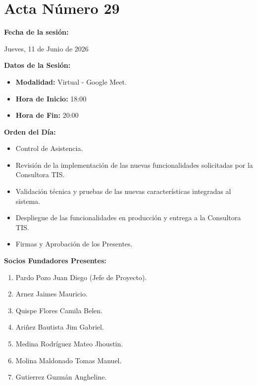 \newpage
\section{Acta Número 29}
\label{sec:acta29}

\noindent \textbf{Fecha de la sesión:}\par
Jueves, 11 de Junio de 2026

\vspace*{0.5cm}
\noindent \textbf{Datos de la Sesión:}
\vspace{-0.2cm}
\begin{itemize}[noitemsep]
    \item \textbf{Modalidad:} Virtual - Google Meet.
    \item \textbf{Hora de Inicio:} 18:00
    \item \textbf{Hora de Fin:} 20:00
\end{itemize}

\vspace*{0.5cm}
\noindent \textbf{Orden del Día:}
\vspace{-0.2cm}
\begin{itemize}[noitemsep]
    \item Control de Asistencia.
    \item Revisión de la implementación de las nuevas funcionalidades solicitadas por la Consultora TIS.
    \item Validación técnica y pruebas de las nuevas características integradas al sistema.
    \item Despliegue de las funcionalidades en producción y entrega a la Consultora TIS.
    \item Firmas y Aprobación de los Presentes.
\end{itemize}

\vspace*{0.5cm}
\noindent \textbf{Socios Fundadores Presentes:}
\vspace{-0.2cm}
\begin{enumerate}[noitemsep]
    \item Pardo Pozo Juan Diego (Jefe de Proyecto).
    \item Arnez Jaimes Mauricio.
    \item Quispe Flores Camila Belen.
    \item Ariñez Bautista Jim Gabriel.
    \item Medina Rodríguez Mateo Jhoustin.
    \item Molina Maldonado Tomas Manuel.
    \item Gutierrez Guzmán Angheline.
\end{enumerate}

